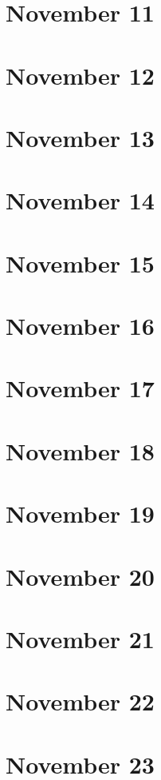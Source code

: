 \section{November 11}

\section{November 12}

\section{November 13}

\section{November 14}

\section{November 15}

\section{November 16}

\section{November 17}

\section{November 18}

\section{November 19}

\section{November 20}

\section{November 21}

\section{November 22}

\section{November 23}

